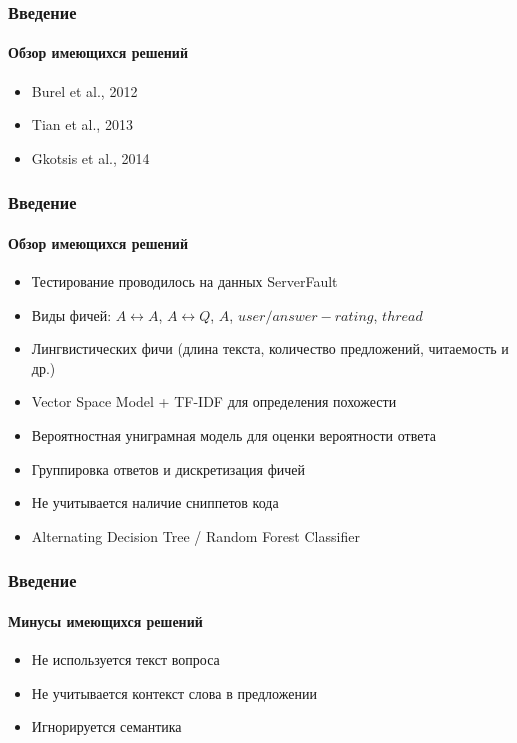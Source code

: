 \documentclass[10pt]{beamer}
\begin{document}

\begin{frame}
\frametitle{Введение}
\framesubtitle{Обзор имеющихся решений}

\begin{itemize}
	\item Burel et al., 2012 \cite{Burel}

	\item Tian et al., 2013 \cite{Tian}

	\item Gkotsis et al., 2014 \cite{Gkotsis}
\end{itemize}

\end{frame}


\begin{frame}
\frametitle{Введение}
\framesubtitle{Обзор имеющихся решений}

\begin{itemize}
	\item Тестирование проводилось на данных ServerFault
	\item Виды фичей: $A \leftrightarrow A$, $A \leftrightarrow Q$, $A$, $user/answer-rating$, $thread$ 
	\item Лингвистических фичи (длина текста, количество предложений, читаемость и др.)
	\item Vector Space Model + TF-IDF для определения похожести
	\item Вероятностная униграмная модель для оценки вероятности ответа
	\item Группировка ответов и дискретизация фичей
	\item Не учитывается наличие сниппетов кода
	\item Alternating Decision Tree / Random Forest Classifier
\end{itemize}

\end{frame}


\begin{frame}
\frametitle{Введение}
\framesubtitle{Минусы имеющихся решений}

\begin{itemize}
	\item Не используется текст вопроса
	\item Не учитывается контекст слова в предложении
	\item Игнорируется семантика
\end{itemize}

\end{frame}
\end{document}
